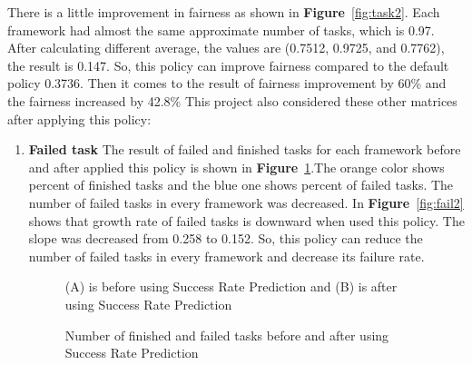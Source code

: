 \documentclass[12pt,oneside,openright,a4paper]{cpe-english-project}
\begin{document}
\hspace{10mm}There is a little improvement in fairness as shown in \textbf{Figure}~\ref{fig:task2}. Each framework had almost the same approximate number of tasks, which is 0.97. After calculating different average, the values are (0.7512, 0.9725, and 0.7762), the result is 0.147. So, this policy can improve fairness compared to the default policy 0.3736. Then it comes to the result of fairness improvement by 60\% and the fairness increased by 42.8\%
\newline
This project also considered these other matrices after applying this policy:  
\begin{enumerate}
  \item \textbf{Failed task}
  \newline
  The result of failed and finished tasks for each framework before and after applied this policy is shown in \textbf{Figure}~\ref{fig:finfail0-2}.The orange color shows percent of finished tasks and the blue one shows percent of failed tasks. The number of failed tasks in every framework was decreased. In \textbf{Figure}~\ref{fig:fail2} shows that growth rate of failed tasks is downward when used this policy. The slope was decreased from 0.258 to 0.152. So, this policy can reduce the number of failed tasks in every framework and decrease its failure rate.
  \begin{figure}[!h]\centering
    \setlength{\fboxrule}{0mm} %
    \setlength{\fboxsep}{0cm}
    \caption{Number of finished and failed tasks before and after using Success Rate Prediction}\label{fig:finfail0-2}
    (A) is before using Success Rate Prediction and (B) is  after using Success Rate Prediction
\end{figure}
\begin{figure}[!h]\centering
    \setlength{\fboxrule}{0mm} %
    \setlength{\fboxsep}{0cm}

\end{figure}
\end{enumerate}
\end{document}

